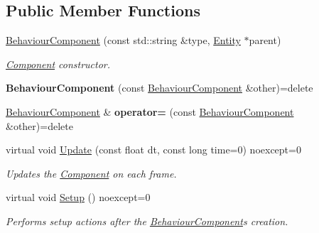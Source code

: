 \subsection*{Public Member Functions}
\begin{DoxyCompactItemize}
\item 
\hyperlink{class_blade_1_1_behaviour_component_a64cc587591d1b38147ce1dbfb8283f7b}{Behaviour\+Component} (const std\+::string \&type, \hyperlink{class_blade_1_1_entity}{Entity} $\ast$parent)
\begin{DoxyCompactList}\small\item\em \hyperlink{class_blade_1_1_component}{Component} constructor. \end{DoxyCompactList}\item 
\mbox{\label{class_blade_1_1_behaviour_component_a2a441fcd82f5b28d588d1eae47a6eaad}} 
{\bfseries Behaviour\+Component} (const \hyperlink{class_blade_1_1_behaviour_component}{Behaviour\+Component} \&other)=delete
\item 
\mbox{\label{class_blade_1_1_behaviour_component_a7dbee722a714cb89ef12a808d2e48210}} 
\hyperlink{class_blade_1_1_behaviour_component}{Behaviour\+Component} \& {\bfseries operator=} (const \hyperlink{class_blade_1_1_behaviour_component}{Behaviour\+Component} \&other)=delete
\item 
virtual void \hyperlink{class_blade_1_1_behaviour_component_a90ec3079534ea1f7225c676881b30c17}{Update} (const float dt, const long time=0) noexcept=0
\begin{DoxyCompactList}\small\item\em Updates the \hyperlink{class_blade_1_1_component}{Component} on each frame. \end{DoxyCompactList}\item 
\mbox{\label{class_blade_1_1_behaviour_component_a41aef293d91db79beb3bb99528158ce1}} 
virtual void \hyperlink{class_blade_1_1_behaviour_component_a41aef293d91db79beb3bb99528158ce1}{Setup} () noexcept=0
\begin{DoxyCompactList}\small\item\em Performs setup actions after the \hyperlink{class_blade_1_1_behaviour_component}{Behaviour\+Component}\textquotesingle{}s creation. \end{DoxyCompactList}\item 

\end{DoxyCompactItemize}
